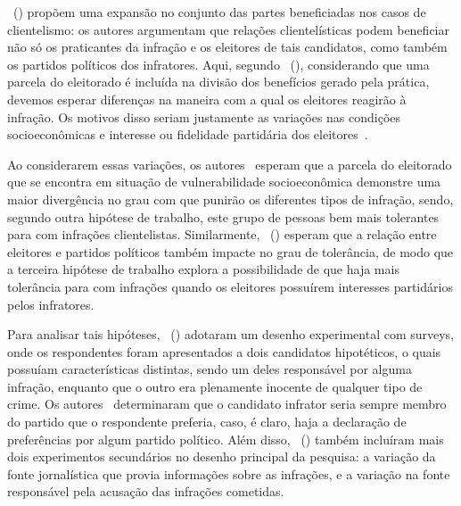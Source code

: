 \documentclass[
	12pt,				%
	openright,			%
	twoside,			%
	a4paper,			%
	openany,
	english,			%
	brazil				%
	]{abntex2}
\begin{document}
~(\citeyear{Botero2021Apr}) propõem uma expansão no conjunto das partes beneficiadas nos casos de clientelismo: os autores argumentam que relações clientelísticas podem beneficiar não só os praticantes da infração e os eleitores de tais candidatos, como também os partidos políticos dos infratores. Aqui, segundo ~(\citeyear{Botero2021Apr}), considerando que uma parcela do eleitorado é incluída na divisão dos benefícios gerado pela prática, devemos esperar diferenças na maneira com a qual os eleitores reagirão à infração. Os motivos disso seriam justamente as variações nas condições socioeconômicas e interesse ou fidelidade partidária dos eleitores~\cite{Botero2021Apr}.

Ao considerarem essas variações, os autores~\cite{Botero2021Apr} esperam que a parcela do eleitorado que se encontra em situação de vulnerabilidade socioeconômica demonstre uma maior divergência no grau com que punirão os diferentes tipos de infração, sendo, segundo outra hipótese de trabalho, este grupo de pessoas bem mais tolerantes para com infrações clientelistas. Similarmente, ~(\citeyear{Botero2021Apr}) esperam que a relação entre eleitores e partidos políticos também impacte no grau de tolerância, de modo que a terceira hipótese de trabalho explora a possibilidade de que haja mais tolerância para com infrações quando os eleitores possuírem interesses partidários pelos infratores.


Para analisar tais hipóteses, ~(\citeyear{Botero2021Apr}) adotaram um desenho experimental com surveys, onde os respondentes foram apresentados a dois candidatos hipotéticos, o quais possuíam características distintas, sendo um deles responsável por alguma infração, enquanto que o outro era plenamente inocente de qualquer tipo de crime. Os autores~\cite{Botero2021Apr} determinaram que o candidato infrator seria sempre membro do partido que o respondente preferia, caso, é claro, haja a declaração de preferências por algum partido político. Além disso, ~(\citeyear{Botero2021Apr}) também incluíram mais dois experimentos secundários no desenho principal da pesquisa: a variação da fonte jornalística que provia informações sobre as infrações, e a variação na fonte responsável pela acusação das infrações cometidas.

\end{document}
